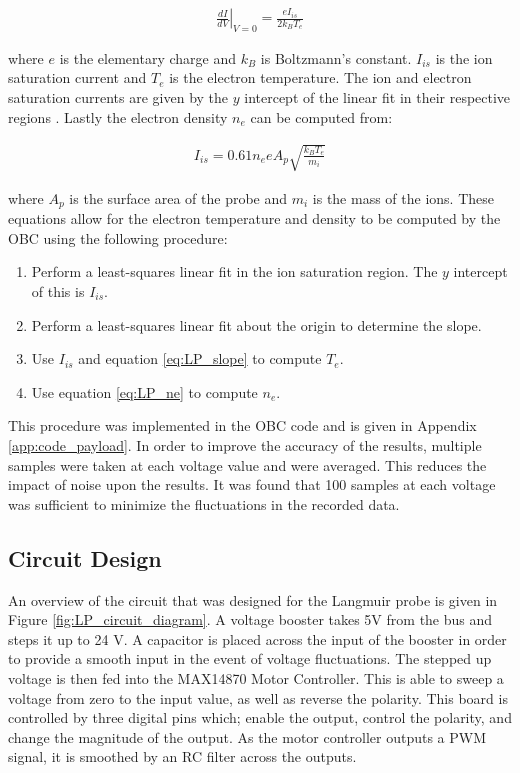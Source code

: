 \begin{align} \label{eq:LP_slope}
	\left. \frac{dI}{dV} \right|_{V=0} = \frac{eI_{is}}{2k_B T_e}
\end{align}

where $e$ is the elementary charge and $k_B$ is Boltzmann's constant. $I_{is}$ is the ion saturation current and $T_e$ is the electron temperature. The ion and electron saturation currents are given by the $y$ intercept of the linear fit in their respective regions \cite{tejumola_development_2015}. Lastly the electron density $n_e$ can be computed from:

\begin{align} \label{eq:LP_ne}
	I_{is} = 0.61 n_e e A_p \sqrt{\frac{k_B T_e}{m_i}}
\end{align}

where $A_p$ is the surface area of the probe and $m_i$ is the mass of the ions. These equations allow for the electron temperature and density to be computed by the OBC using the following procedure:

\begin{enumerate}
	\item Perform a least-squares linear fit in the ion saturation region. The $y$ intercept of this is $I_{is}$.
	\item Perform a least-squares linear fit about the origin to determine the slope.
	\item Use $I_{is}$ and equation \eqref{eq:LP_slope} to compute $T_e$.
	\item Use equation \eqref{eq:LP_ne} to compute $n_e$.
\end{enumerate}

This procedure was implemented in the OBC code and is given in Appendix  \ref{app:code_payload}. In order to improve the accuracy of the results, multiple samples were taken at each voltage value and were averaged. This reduces the impact of noise upon the results. It was found that 100 samples at each voltage was sufficient to minimize the fluctuations in the recorded data.

\subsection{Circuit Design}
An overview of the circuit that was designed for the Langmuir probe is given in Figure \ref{fig:LP_circuit_diagram}. A voltage booster takes 5V from the bus and steps it up to 24 V. A capacitor is placed across the input of the booster in order to provide a smooth input in the event of voltage fluctuations. The stepped up voltage is then fed into the MAX14870 Motor Controller. This is able to sweep a voltage from zero to the input value, as well as reverse the polarity. This board is controlled by three digital pins which; enable the output, control the polarity, and change the magnitude of the output. As the motor controller outputs a PWM signal, it is smoothed by an RC filter across the outputs.\\

